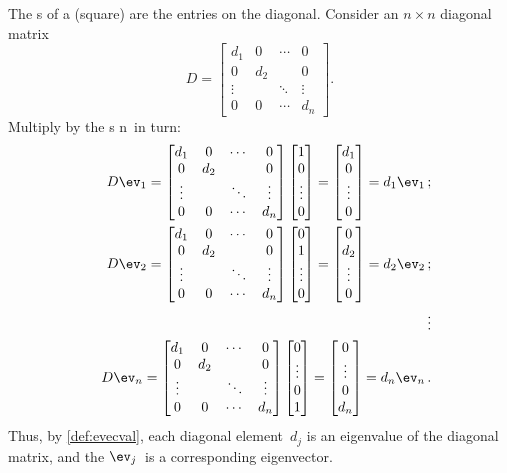 \begin{example} \label{eg:eigndiag}
The s of a (square)  are the entries on the diagonal.
Consider an \(n\times n\) diagonal matrix
\def\dd{\begin{bmatrix} d_1&0&\cdots&0
\\0&d_2&&0
\\\vdots&&\ddots&\vdots
\\0&0&\cdots&d_n \end{bmatrix}}
\begin{equation*}
D=\dd.
\end{equation*}
Multiply by the s \hlist\ev n\ in turn:
\begin{eqnarray*}
&&D\ev_1
=\dd
\begin{bmatrix} 1\\0\\\vdots\\0 \end{bmatrix}
=\begin{bmatrix} d_1\\0\\\vdots\\0 \end{bmatrix}
=d_1\ev_1\,;
\\&&D\ev_2
=\dd
\begin{bmatrix} 0\\1\\\vdots\\0 \end{bmatrix}
=\begin{bmatrix} 0\\d_2\\\vdots\\0 \end{bmatrix}
=d_2\ev_2\,;
\\&&\quad\vdots
\\&&D\ev_n
=\dd
\begin{bmatrix} 0\\\vdots\\0\\1 \end{bmatrix}
=\begin{bmatrix} 0\\\vdots\\0\\d_n \end{bmatrix}
=d_n\ev_n\,.
\end{eqnarray*}
Thus, by \cref{def:evecval}, each diagonal element~\(d_j\)  is an eigenvalue of the diagonal matrix, and the  \(\ev_j\)~is a corresponding eigenvector.
\end{example}

